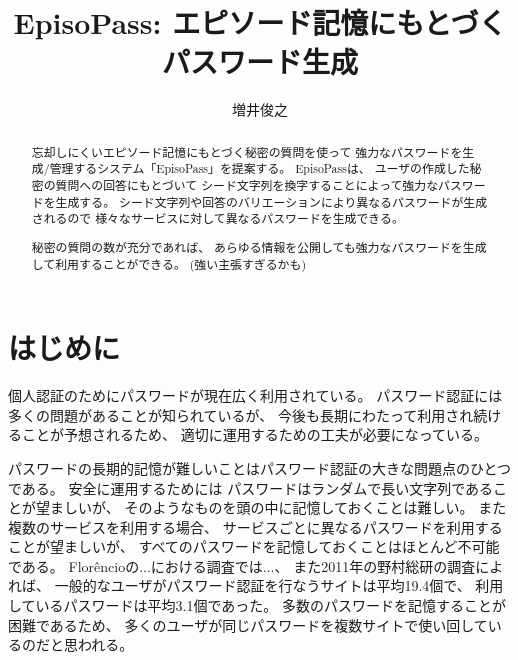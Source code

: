 \documentclass[twoside]{wiss}
\begin{document}
\title{EpisoPass: エピソード記憶にもとづくパスワード生成}

\author{増井俊之}

\begin{abstract}
忘却しにくいエピソード記憶にもとづく秘密の質問を使って
強力なパスワードを生成/管理するシステム「EpisoPass」を提案する。
EpisoPassは、
ユーザの作成した秘密の質問への回答にもとづいて
シード文字列を換字することによって強力なパスワードを生成する。
シード文字列や回答のバリエーションにより異なるパスワードが生成されるので
様々なサービスに対して異なるパスワードを生成できる。

秘密の質問の数が充分であれば、
あらゆる情報を公開しても強力なパスワードを生成して利用することができる。 (強い主張すぎるかも)
\end{abstract}

\maketitle

\section{はじめに}

個人認証のためにパスワードが現在広く利用されている。
パスワード認証には多くの問題があることが知られているが\cite{増井_ユニマガ}、
今後も長期にわたって利用され続けることが予想されるため、
適切に運用するための工夫が必要になっている。

パスワードの長期的記憶が難しいことはパスワード認証の大きな問題点のひとつである。
安全に運用するためには
パスワードはランダムで長い文字列であることが望ましいが、
そのようなものを頭の中に記憶しておくことは難しい。
また複数のサービスを利用する場合、
サービスごとに異なるパスワードを利用することが望ましいが、
すべてのパスワードを記憶しておくことはほとんど不可能である。
%
Flor\^{e}ncioの...における調査では...\cite{Florencio:2007:LSW:1242572.1242661}、
また2011年の野村総研の調査によれば、
一般的なユーザがパスワード認証を行なうサイトは平均19.4個で、
利用しているパスワードは平均3.1個であった\cite{野村総研}。
多数のパスワードを記憶することが困難であるため、
多くのユーザが同じパスワードを複数サイトで使い回しているのだと思われる。
\end{document}
